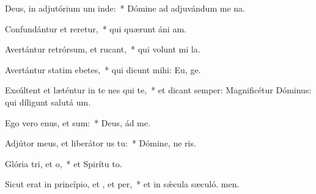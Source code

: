 \item Deus, in adjutórium um inde:~* Dómine ad adjuvándum me na.
\item Confundántur et reretur,~* qui quærunt áni am.
\item Avertántur retrórsum, et rucant,~* qui volunt mi la.
\item Avertántur statim ebetes,~* qui dicunt mihi: Eu, ge.
\item Exsúltent et læténtur in te nes qui  te,~* et dicant semper: Magnificétur Dóminus: qui díligunt salutá um.
\item Ego vero enus, et  sum:~* Deus, ád me.
\item Adjútor meus, et liberátor us  tu:~* Dómine, ne ris.
\item Glória tri, et o,~* et Spirítu to.
\item Sicut erat in princípio, et , et per,~* et in sǽcula sæculó. men.
